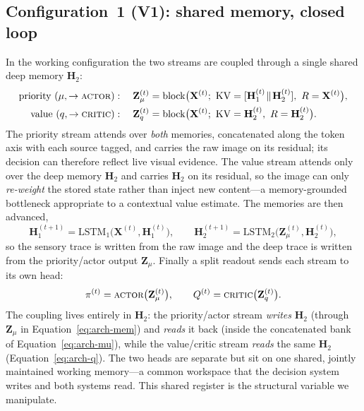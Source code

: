 \subsection{Configuration~1 (V1): shared memory, closed loop}
In the working configuration the two streams are coupled through a single shared deep memory $\mathbf{H}_2$:
\begin{align}
\text{priority }(\mu,\to\textsc{actor}):\quad \mathbf{Z}_{\mu}^{(t)} &= \mathrm{block}\big(\mathbf{X}^{(t)};\ \mathrm{KV}=[\mathbf{H}_1^{(t)}\!\parallel\!\mathbf{H}_2^{(t)}],\ R=\mathbf{X}^{(t)}\big),\label{eq:arch-mu}\\
\text{value }(q,\to\textsc{critic}):\quad \mathbf{Z}_{q}^{(t)} &= \mathrm{block}\big(\mathbf{X}^{(t)};\ \mathrm{KV}=\mathbf{H}_2^{(t)},\ R=\mathbf{H}_2^{(t)}\big).\label{eq:arch-q}
\end{align}
The priority stream attends over \emph{both} memories, concatenated along the token axis with each source tagged, and carries the raw image on its residual; its decision can therefore reflect live visual evidence. The value stream attends only over the deep memory $\mathbf{H}_2$ and carries $\mathbf{H}_2$ on its residual, so the image can only \emph{re-weight} the stored state rather than inject new content---a memory-grounded bottleneck appropriate to a contextual value estimate. The memories are then advanced,
\begin{equation}
\mathbf{H}_1^{(t+1)}=\mathrm{LSTM}_1\!\big(\mathbf{X}^{(t)},\mathbf{H}_1^{(t)}\big),\qquad \mathbf{H}_2^{(t+1)}=\mathrm{LSTM}_2\!\big(\mathbf{Z}_{\mu}^{(t)},\mathbf{H}_2^{(t)}\big),
\label{eq:arch-mem}
\end{equation}
so the sensory trace is written from the raw image and the deep trace is written from the priority/actor output $\mathbf{Z}_{\mu}$. Finally a split readout sends each stream to its own head:
\begin{equation}
\pi^{(t)}=\textsc{actor}\big(\mathbf{Z}_{\mu}^{(t)}\big),\qquad Q^{(t)}=\textsc{critic}\big(\mathbf{Z}_{q}^{(t)}\big).
\label{eq:arch-heads}
\end{equation}
The coupling lives entirely in $\mathbf{H}_2$: the priority/actor stream \emph{writes} $\mathbf{H}_2$ (through $\mathbf{Z}_{\mu}$ in Equation~\eqref{eq:arch-mem}) and \emph{reads} it back (inside the concatenated bank of Equation~\eqref{eq:arch-mu}), while the value/critic stream \emph{reads} the same $\mathbf{H}_2$ (Equation~\eqref{eq:arch-q}). The two heads are separate but sit on one shared, jointly maintained working memory---a common workspace that the decision system writes and both systems read. This shared register is the structural variable we manipulate.

